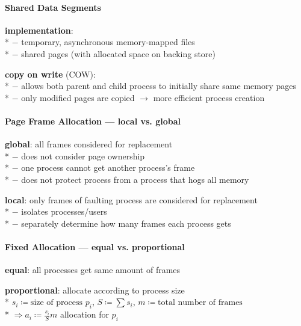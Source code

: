 \paragraph{Shared Data Segments}
\begin{items}
  \item \textbf{implementation}: \\*
    $ - $ temporary, asynchronous memory-mapped files \\*
    $ - $ shared pages (with allocated space on backing store)
  \item \textbf{copy on write} (COW): \\*
    $ - $ allows both parent and child process to initially share same memory pages \\*
    $ - $ only modified pages are copied $ \to $ more efficient process creation
\end{items}

\paragraph{Page Frame Allocation --- local vs. global}
\begin{items}
  \item \textbf{global}: all frames considered for replacement \\*
    $ - $ does not consider page ownership \\*
    $ - $ one process cannot get another process's frame \\*
    $ - $ does not protect process from a process that hogs all memory
  \item \textbf{local}: only frames of faulting process are considered for replacement \\*
    $ - $ isolates processes/users \\*
    $ - $ separately determine how many frames each process gets
\end{items}

\paragraph{Fixed Allocation --- equal vs. proportional}
\begin{items}
  \item \textbf{equal}: all processes get same amount of frames
  \item \textbf{proportional}: allocate according to process size \\*
    $ s_i \coloneqq \text{size of process } p_i $, $ S \coloneqq \sum s_i $, $ m \coloneqq \text{total number of frames } $ \\*
    $ \Rightarrow a_i \coloneqq \frac{s_i}{S}m $ allocation for $ p_i $
\end{items}


